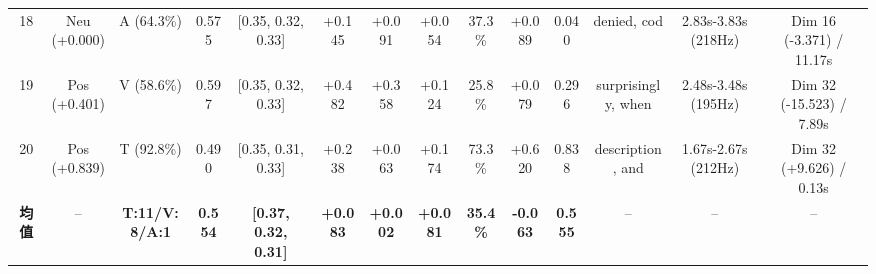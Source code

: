 \documentclass{huawei-mcm}
\begin{document}
\begin{table}[htbp]
{\begin{tabular}{cccccccccccccc}
    18 & Neu (+0.000) & A (64.3\%) & 0.575 & [0.35, 0.32, 0.33] & +0.145 & +0.091 & +0.054 & 37.3\% & +0.089 & 0.040 & denied, cod & 2.83s-3.83s (218Hz) & Dim 16 (-3.371) / 11.17s \\
    19 & Pos (+0.401) & V (58.6\%) & 0.597 & [0.35, 0.32, 0.33] & +0.482 & +0.358 & +0.124 & 25.8\% & +0.079 & 0.296 & surprisingly, when & 2.48s-3.48s (195Hz) & Dim 32 (-15.523) / 7.89s \\
    20 & Pos (+0.839) & T (92.8\%) & 0.490 & [0.35, 0.31, 0.33] & +0.238 & +0.063 & +0.174 & 73.3\% & +0.620 & 0.838 & description, and & 1.67s-2.67s (212Hz) & Dim 32 (+9.626) / 0.13s \\
    \midrule
    \textbf{均值} & -- & \textbf{T:11/V:8/A:1} & \textbf{0.554} & \textbf{[0.37, 0.32, 0.31]} & \textbf{+0.083} & \textbf{+0.002} & \textbf{+0.081} & \textbf{35.4\%} & \textbf{-0.063} & \textbf{0.555} & -- & -- & -- \\
    \bottomrule
  \end{tabular}
  }
\end{table}
\end{document}
